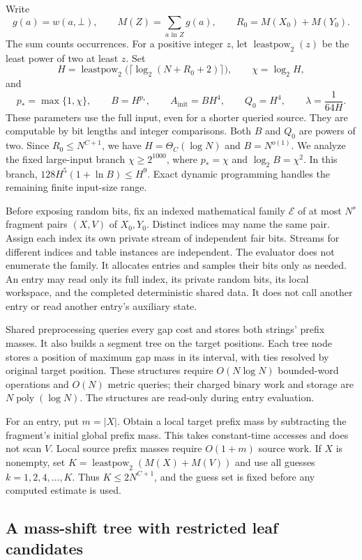 \documentclass[11pt]{article}
\theoremstyle{definition}
\newcommand{\gap}{\bot}
\newcommand{\1}{\mathbf 1}
\begin{document}
Write
\[
 g(a)=w(a,\gap),\qquad M(Z)=\sum_{a\text{ in }Z}g(a),\qquad
 R_0=M(X_0)+M(Y_0).
\]
The sum counts occurrences. For a positive integer $z$, let
$\operatorname{leastpow}_2(z)$ be the least power of two at least $z$.
Set
\[
 H=\operatorname{leastpow}_2\bigl(\lceil\log_2(N+R_0+2)\rceil\bigr),
 \qquad \chi=\log_2H,
\]
and
\[
 p_*=\max\{1,\chi\},\qquad B=H^{p_*},\qquad
 A_{\mathrm{init}}=BH^4,\qquad Q_0=H^4,\qquad
 \lambda=\frac1{64H}.
\]
These parameters use the full input, even for a shorter queried source.
They are computable by bit lengths and integer comparisons. Both $B$
and $Q_0$ are powers of two. Since $R_0\le N^{C+1}$, we have
$H=\Theta_C(\log N)$ and $B=N^{o(1)}$.
We analyze the fixed large-input branch $\chi\ge2^{1000}$, where
$p_*=\chi$ and $\log_2B=\chi^2$. In this branch,
$128H^5(1+\ln B)\le H^9$. Exact dynamic programming handles the remaining
finite input-size range.

Before exposing random bits, fix an indexed mathematical family
$\mathcal E$ of at most $N^s$ fragment pairs $(X,V)$ of $X_0,Y_0$.
Distinct indices may name the same pair. Assign each index its own
private stream of independent fair bits. Streams for different indices
and table instances are independent. The evaluator does not enumerate
the family. It allocates entries and samples their bits only as needed.
An entry may read only its full index, its private random bits,
its local workspace, and the completed deterministic shared data.
It does not call another entry or read another entry's auxiliary state.

Shared preprocessing queries every gap cost and stores both strings'
prefix masses. It also builds a segment tree on the target positions.
Each tree node stores a position of maximum gap mass in its interval,
with ties resolved by original target position. These structures require
$O(N\log N)$ bounded-word operations and $O(N)$ metric queries; their
charged binary work and storage are $N\operatorname{poly}(\log N)$.
The structures are read-only during entry evaluation.

For an entry, put $m=|X|$. Obtain a local target prefix mass by subtracting
the fragment's initial global prefix mass. This takes constant-time
accesses and does not scan $V$. Local source prefix masses require
$O(1+m)$ source work. If $X$ is nonempty, set
$K=\operatorname{leastpow}_2(M(X)+M(V))$ and use all guesses
$k=1,2,4,\ldots,K$. Thus $K\le2N^{C+1}$, and the guess set is fixed
before any computed estimate is used.

\subsection{A mass-shift tree with restricted leaf candidates}
\end{document}
